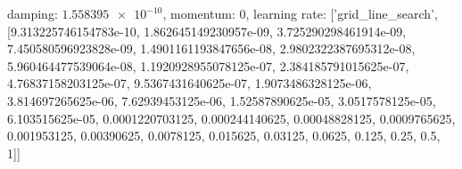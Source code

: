 damping: $\num[scientific-notation=true]{1.558395e-10}$, momentum: $\num[scientific-notation=false]{0}$, learning rate: ['grid_line_search', [9.313225746154783e-10, 1.862645149230957e-09, 3.725290298461914e-09, 7.450580596923828e-09, 1.4901161193847656e-08, 2.9802322387695312e-08, 5.960464477539064e-08, 1.1920928955078125e-07, 2.384185791015625e-07, 4.76837158203125e-07, 9.5367431640625e-07, 1.9073486328125e-06, 3.814697265625e-06, 7.62939453125e-06, 1.52587890625e-05, 3.0517578125e-05, 6.103515625e-05, 0.0001220703125, 0.000244140625, 0.00048828125, 0.0009765625, 0.001953125, 0.00390625, 0.0078125, 0.015625, 0.03125, 0.0625, 0.125, 0.25, 0.5, 1]]